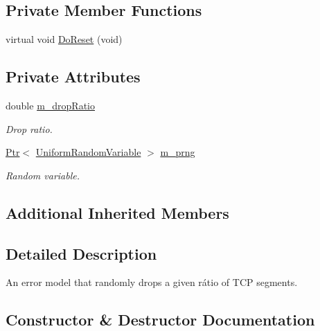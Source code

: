 \subsection*{Private Member Functions}
\begin{DoxyCompactItemize}
\item 
virtual void \hyperlink{classTcpDropRatioErrorModel_af75290ccfc56d9487b2aeae4982e88e1}{Do\+Reset} (void)
\end{DoxyCompactItemize}
\subsection*{Private Attributes}
\begin{DoxyCompactItemize}
\item 
double \hyperlink{classTcpDropRatioErrorModel_a64747a2e0c03e24a8b4bf283f83705b5}{m\+\_\+drop\+Ratio}
\begin{DoxyCompactList}\small\item\em Drop ratio. \end{DoxyCompactList}\item 
\hyperlink{classns3_1_1Ptr}{Ptr}$<$ \hyperlink{classns3_1_1UniformRandomVariable}{Uniform\+Random\+Variable} $>$ \hyperlink{classTcpDropRatioErrorModel_a5a62995f1d5f3b8aa57204b09abb39e5}{m\+\_\+prng}
\begin{DoxyCompactList}\small\item\em Random variable. \end{DoxyCompactList}\end{DoxyCompactItemize}
\subsection*{Additional Inherited Members}


\subsection{Detailed Description}
An error model that randomly drops a given rátio of T\+CP segments. 

\subsection{Constructor \& Destructor Documentation}
